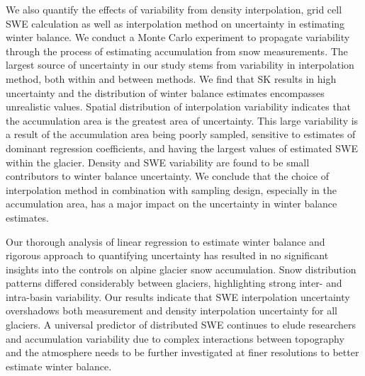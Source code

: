 \documentclass[review,oneside, letterpaper]{igs}
\begin{document}
We also quantify the effects of variability from density interpolation, grid cell SWE calculation as well as interpolation method on uncertainty in estimating winter balance. We conduct a Monte Carlo experiment to propagate variability through the process of estimating accumulation from snow measurements. The largest source of uncertainty in our study stems from variability in interpolation method, both within and between methods. We find that SK results in high uncertainty and the distribution of winter balance estimates encompasses unrealistic values. Spatial distribution of interpolation variability indicates that the accumulation area is the greatest area of uncertainty. This large variability is a result of the accumulation area being poorly sampled, sensitive to estimates of dominant regression coefficients, and having the largest values of estimated SWE within the glacier. Density and SWE variability are found to be small contributors to winter balance uncertainty. We conclude that the choice of interpolation method in combination with sampling design, especially in the accumulation area, has a major impact on the uncertainty in winter balance estimates.

Our thorough analysis of linear regression to estimate winter balance and rigorous approach to quantifying uncertainty has resulted in no significant insights into the controls on alpine glacier snow accumulation. Snow distribution patterns differed considerably between glaciers, highlighting strong inter- and intra-basin variability. Our results indicate that SWE interpolation uncertainty overshadows both measurement and density interpolation uncertainty for all glaciers. A universal predictor of distributed SWE continues to elude researchers and accumulation variability due to complex interactions between topography and the atmosphere needs to be further investigated at finer resolutions to better estimate winter balance. 


%

%


\end{document}
